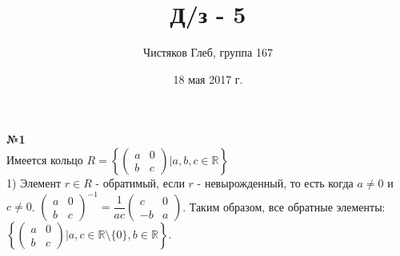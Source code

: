 \documentclass[a4paper, 12pt]{article}
\title{Д/з - 5}
\author{Чистяков Глеб, группа 167}
\date{18 мая 2017 г.}
\begin{document}
	
	\maketitle
	
	\textbf{№1} \\
	
	Имеется кольцо $R = \left\{ \begin{pmatrix} a & 0 \\ b & c \end{pmatrix} \bigg| a, b, c \in \mathbb R \right\}$ \\
	
	1) Элемент $r \in R$ - обратимый, если $r$ - невырожденный, то есть когда $a \neq 0$ и $c \neq 0$. $\begin{pmatrix} a & 0 \\ b & c \end{pmatrix}^{-1} = \dfrac{1}{ac}\begin{pmatrix} c & 0 \\ -b & a \end{pmatrix}$. Таким образом, все обратные элементы: $\left\{ \begin{pmatrix} a & 0 \\ b & c \end{pmatrix} \bigg| a, c \in \mathbb R \setminus \{0\}, b \in \mathbb{R} \right\}$. \\
	
\end{document}
